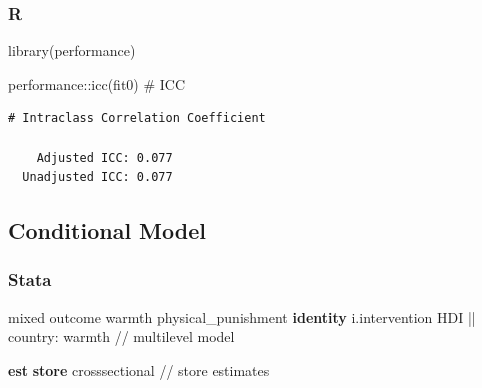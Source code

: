 \documentclass[
  letterpaper,
  DIV=11,
  numbers=noendperiod]{scrreprt}
\newenvironment{Shaded}{\begin{snugshade}}{\end{snugshade}}
\newcommand{\CommentTok}[1]{\textcolor[rgb]{0.37,0.37,0.37}{#1}}
\newcommand{\FunctionTok}[1]{\textcolor[rgb]{0.28,0.35,0.67}{#1}}
\newcommand{\KeywordTok}[1]{\textcolor[rgb]{0.00,0.23,0.31}{\textbf{#1}}}
\newcommand{\NormalTok}[1]{\textcolor[rgb]{0.00,0.23,0.31}{#1}}
\newcommand{\SpecialCharTok}[1]{\textcolor[rgb]{0.37,0.37,0.37}{#1}}
\begin{document}
\subsubsection{R}

\begin{Shaded}
\begin{Highlighting}[]
\FunctionTok{library}\NormalTok{(performance) }

\NormalTok{performance}\SpecialCharTok{::}\FunctionTok{icc}\NormalTok{(fit0) }\CommentTok{\# ICC}
\end{Highlighting}
\end{Shaded}

\begin{verbatim}
# Intraclass Correlation Coefficient

    Adjusted ICC: 0.077
  Unadjusted ICC: 0.077
\end{verbatim}

\subsection{Conditional Model}\label{conditional-model}

\subsubsection{Stata}

\begin{Shaded}
\begin{Highlighting}[]

\NormalTok{mixed outcome warmth physical\_punishment }\KeywordTok{identity}\NormalTok{ i.intervention HDI || country: warmth }\CommentTok{// multilevel model}

\KeywordTok{est} \KeywordTok{store}\NormalTok{ crosssectional }\CommentTok{// store estimates}
\end{Highlighting}
\end{Shaded}
\end{document}
